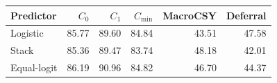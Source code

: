 \begin{tabular}{lrrrrr}\toprule
Predictor & $C_0$ & $C_1$ & $C_{\min}$ & MacroCSY & Deferral \\
\midrule
Logistic & 85.77 & 89.60 & 84.84 & 43.51 & 47.58 \\
Stack & 85.36 & 89.47 & 83.74 & 48.18 & 42.01 \\
Equal-logit & 86.19 & 90.96 & 84.82 & 46.70 & 44.37 \\
\bottomrule\end{tabular}
